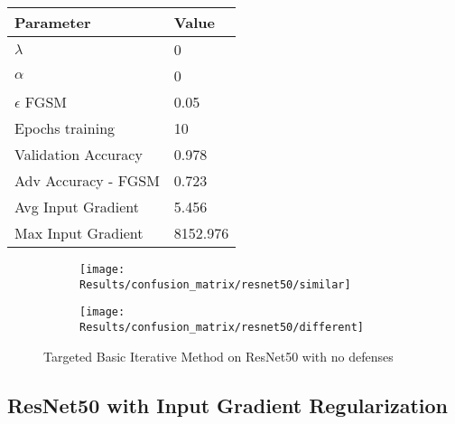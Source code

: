 \documentclass[draft,final]{vutinfth} %
\begin{document}
\begin{table}[h]
  \centering
  \begin{tabular}{ll}
    \toprule
			Parameter			& Value   \\
    \midrule
			$\lambda$								& 0				\\
			$\alpha$								& 0				\\
			$\epsilon$ FGSM					& 0.05		\\
			Epochs training					& 10			\\
			
			Validation Accuracy			& 0.978		\\ 
			Adv Accuracy - FGSM			& 0.723		\\
			
			Avg Input Gradient			& 5.456		\\
			Max Input Gradient			& 8152.976\\
    \bottomrule
  \end{tabular}
\end{table}


\begin{figure}[h]
  \begin{subfigure}[b]{0.5\columnwidth}
		\centering
    \texttt{[image: Results/confusion\_matrix/resnet50/similar]}
    \label{fig:exp:cm:resnet50:similar}
  \end{subfigure}
  \begin{subfigure}[b]{0.5\columnwidth}
		\centering
    \texttt{[image: Results/confusion\_matrix/resnet50/different]}
    \label{fig:exp:cm:resnet50:different}
  \end{subfigure}
  \caption{Targeted Basic Iterative Method on ResNet50 with no defenses}
  \label{fig:exp:cm:resnet50}
\end{figure}
\clearpage

\subsection{ResNet50 with Input Gradient Regularization}
\end{document}
